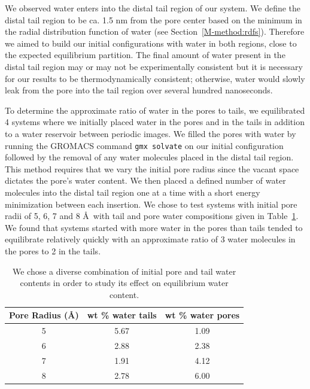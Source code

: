 \documentclass{article}
\begin{document}
\begin{enumerate}
	We observed water enters into the distal tail region of our system. We define the 
	distal tail region to be ca. 1.5 nm from the pore center based on the minimum in 
	the radial distribution function of water (see Section~\ref{M-method:rdfs}). Therefore
	we aimed to build our initial configurations with water in both regions, close to
	the expected equilibrium partition. The final amount of water present in the distal
	tail region may or may not be experimentally consistent but it is necessary for our
	results to be thermodynamically consistent; otherwise, water would slowly leak 
	from the pore into the tail region over several hundred nanoseconds. 
	
	To determine the approximate ratio of water in the pores to tails, we equilibrated 4 systems
	where we initially placed water in the pores and in the tails in addition to a water
	reservoir between periodic images. We filled the pores with water by running the 
	GROMACS command \texttt{gmx solvate} on our initial configuration followed by the 
	removal of any water molecules placed in the distal tail region. This method requires
	that we vary the initial pore radius since the vacant space dictates the pore's 
	water content. We then placed a defined number of water molecules into the distal tail
	region one at a time with a short energy minimization between each insertion.
	We chose to test systems with initial pore radii of 5, 6, 7 and 8 \AA~with tail and 
	pore water compositions given in Table~\ref{table:water_content}. We found that 
	systems started with more water in the pores than tails tended to equilibrate relatively
	quickly with an approximate ratio of 3 water molecules in the pores to 2 in the tails.

    \begin{table}[!htb]
    \centering
    \begin{tabular}{|c|c|c|}
    \hline
    Pore Radius (\AA) & wt \% water tails & wt \% water pores \\
    \hline
    5                 &        5.67       &     1.09          \\
    6                 &        2.88       &     2.38          \\
    7                 &        1.91       &     4.12          \\
    8                 &        2.78       &     6.00          \\
    \hline
    \end{tabular}
    \caption{We chose a diverse combination of initial pore and tail water
    contents in order to study its effect on equilibrium water
    content.}\label{table:water_content}
    \end{table}
  

\end{enumerate}
\end{document}
